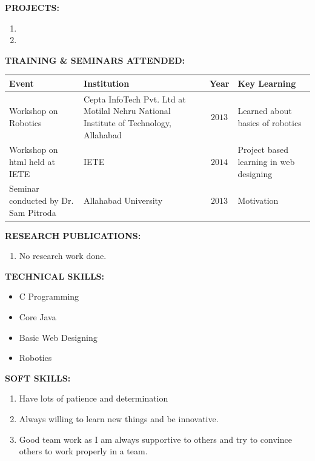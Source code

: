 \documentclass{article}
\begin{document}
\textbf{PROJECTS:}
\begin{enumerate}
	\item
    \item
\end{enumerate}

\textbf{TRAINING \& SEMINARS ATTENDED:}\\
\begin{tabular}{|p{2in}|p{2.5in}|c|p{1.3in}|}
	\hline
	\qquad \qquad \qquad \textbf{Event} & \qquad \qquad \qquad \textbf{Institution} & \textbf{Year} & \qquad \textbf{Key Learning}\\
	\hline
	Workshop on Robotics & Cepta InfoTech Pvt. Ltd at Motilal Nehru National Institute of Technology, Allahabad & $2013$ & Learned about basics of robotics\\
	\hline
	Workshop on html held at IETE & IETE & $2014$ & Project based learning in web designing\\
	\hline
	Seminar conducted by Dr. Sam Pitroda & Allahabad University & $2013$ & Motivation\\
	\hline
\end{tabular} 
\newline 
\newline

\textbf{RESEARCH PUBLICATIONS:}
\begin{enumerate}
	\item No research work done.
\end{enumerate}

\textbf{TECHNICAL SKILLS:}
\begin{itemize}
	\item C Programming
	\item Core Java
	\item Basic Web Designing
	\item Robotics
\end{itemize}
\newpage

\textbf{SOFT SKILLS:}
\begin{enumerate}
	\item Have lots of patience and determination 
	\item Always willing to learn new things and be innovative.
	\item Good team work as I am always supportive to others and try to convince others to work properly in a team.
\end{enumerate}
\end{document}
